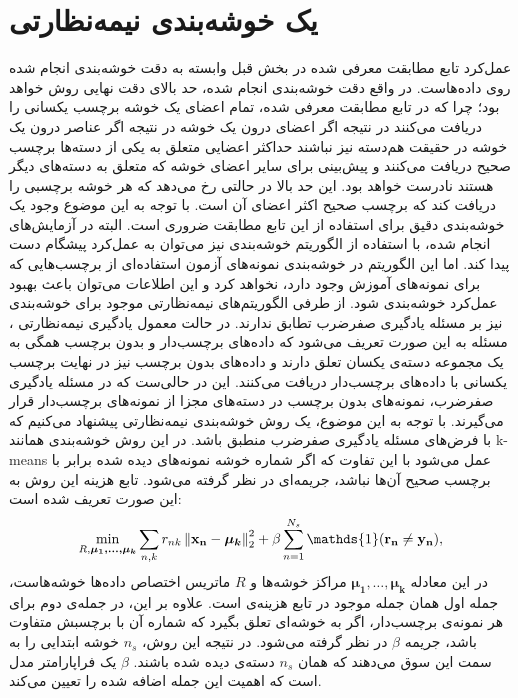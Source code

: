\section{یک خوشه‌بندی نیمه‌نظارتی}\label{clustering_method}
عمل‌کرد تابع مطابقت معرفی شده در بخش قبل وابسته به دقت خوشه‌بندی انجام شده روی داده‌هاست. در واقع دقت خوشه‌بندی انجام شده، حد بالای دقت نهایی روش خواهد بود؛ چرا که در تابع مطابقت معرفی شده، تمام اعضای یک خوشه برچسب یکسانی را دریافت می‌کنند در نتیجه اگر اعضای درون یک خوشه در نتیجه اگر عناصر درون یک خوشه در حقیقت هم‌دسته نیز نباشند حداکثر اعضایی متعلق به یکی از دسته‌ها برچسب صحیح دریافت می‌کنند و پیش‌بینی برای سایر اعضای خوشه که متعلق به دسته‌های دیگر هستند نادرست خواهد بود.
 این حد بالا  در حالتی رخ می‌دهد که هر خوشه برچسبی را دریافت کند که برچسب صحیح  اکثر اعضای آن است. با توجه به این موضوع وجود یک خوشه‌بندی دقیق برای استفاده از این تابع مطابقت ضروری است. البته در آزمایش‌های انجام شده، با استفاده از  الگوریتم خوشه‌بندی
 \cite{kmeans}
نیز می‌توان به عمل‌کرد پیشگام دست پیدا کند. اما این الگوریتم در خوشه‌بندی نمونه‌های آزمون استفاده‌ای از برچسب‌هایی که برای نمونه‌های آموزش وجود دارد، نخواهد کرد و این اطلاعات می‌توان باعث بهبود عمل‌کرد خوشه‌بندی شود. از طرفی الگوریتم‌های نیمه‌نظارتی موجود برای خوشه‌بندی نیز بر مسئله یادگیری صفرضرب تطابق ندارند. در حالت معمول یادگیری نیمه‌نظارتی \cite{chapel06}، مسئله به این صورت تعریف می‌شود که داده‌های برچسب‌دار و بدون برچسب همگی به یک مجموعه دسته‌ی یکسان تعلق دارند و داده‌های بدون برچسب نیز در نهایت برچسب یکسانی با داده‌های برچسب‌دار دریافت می‌کنند. این در حالی‌ست که در مسئله یادگیری صفرضرب، نمونه‌های بدون برچسب در دسته‌های مجزا از نمونه‌های برچسب‌دار قرار می‌گیرند. با توجه به این موضوع، یک روش خوشه‌بندی نیمه‌نظارتی پیشنهاد می‌کنیم که با فرض‌های مسئله یادگیری صفرضرب منطبق باشد. در این روش خوشه‌بندی همانند k-means عمل می‌شود با این تفاوت که اگر شماره خوشه نمونه‌های دیده شده  برابر با برچسب صحیح آن‌ها نباشد، جریمه‌ای در نظر گرفته می‌شود. تابع هزینه این روش به این صورت تعریف شده است:
\begin{equation} \label{eq:my_clustering}
\min_{R, \boldsymbol{\mu_1, \ldots, \mu_k }}  \sum_{n,k} r_{nk} \normtwo{\mathbf{x_n} - \boldsymbol{\mu_k}} +
 \beta \sum_{n=1}^{N_s} \mathds{1}(\mathbf{r_n} \neq \mathbf{y_n}),
\end{equation}
در این معادله $ \boldsymbol{\mu_1, \ldots, \mu_k }$ مراکز خوشه‌ها و $R$ ماتریس اختصاص داده‌ها خوشه‌هاست، جمله اول همان جمله موجود در تابع هزینه‌ی
است. علاوه بر این، در جمله‌ی دوم برای هر نمونه‌ی برچسب‌دار، اگر به خوشه‌ای تعلق بگیرد که شماره آن با برچسبش متفاوت باشد، جریمه $\beta$ در نظر گرفته می‌شود. در نتیجه این روش، $n_s$ خوشه ابتدایی را به سمت این سوق می‌دهند که همان $n_s$ دسته‌ی دیده شده باشند.  $\beta$ یک فراپارامتر مدل است که اهمیت این جمله اضافه شده را تعیین می‌کند.

